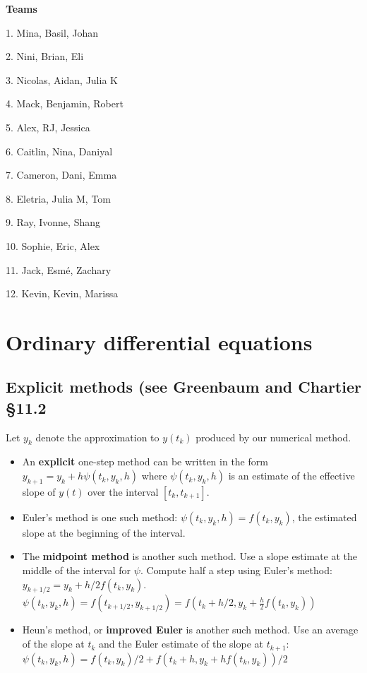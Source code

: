 \documentclass[12pt,letterpaper,noanswers]{exam}
\begin{document}
\noindent \textbf{Teams}
\begin{multicols}{3}
1. Mina, Basil, Johan

2. Nini, Brian, Eli

3. Nicolas, Aidan, Julia K

4. Mack, Benjamin, Robert

5. Alex, RJ, Jessica

6. Caitlin, Nina, Daniyal

7. Cameron, Dani, Emma

8. Eletria, Julia M, Tom

9. Ray, Ivonne, Shang

10.  Sophie, Eric, Alex

11. Jack, Esmé, Zachary

12. Kevin, Kevin, Marissa

\end{multicols}


\section*{Ordinary differential equations}
\subsection*{Explicit methods (see Greenbaum and Chartier \S 11.2}
\begin{tcolorbox}
Let $y_k$ denote the approximation to $y(t_k)$ produced by our numerical method.
\begin{itemize}
\itemsep0pt
    \item An \textbf{explicit} one-step method can be written in the form $y_{k+1} = y_k + h \psi(t_k,y_k,h)$ where $\psi(t_k,y_k,h)$ is an estimate of the effective slope of $y(t)$ over the interval $[t_k,t_{k+1}]$.
    \item Euler's method is one such method: $\psi(t_k,y_k,h) = f(t_k,y_k)$, the estimated slope at the beginning of the interval.
    \item The \textbf{midpoint method} is another such method.  Use a slope estimate at the middle of the interval for $\psi$.  Compute half a step using Euler's method: $y_{k+1/2} = y_k + h/2f(t_k,y_k)$.  $\psi(t_k,y_k,h) = f(t_{k+1/2},y_{k+1/2}) = f\left(t_k + h/2, y_k+\frac{h}{2}f(t_k,y_k)\right)$
    \item Heun's method, or \textbf{improved Euler} is another such method.  Use an average of the slope at $t_k$ and the Euler estimate of the slope at $t_{k+1}$: $\psi(t_k,y_k,h) = f(t_k,y_k)/2 + f(t_k + h,y_k+hf(t_k,y_k))/2$
\end{itemize}
\end{tcolorbox}
\end{document}
